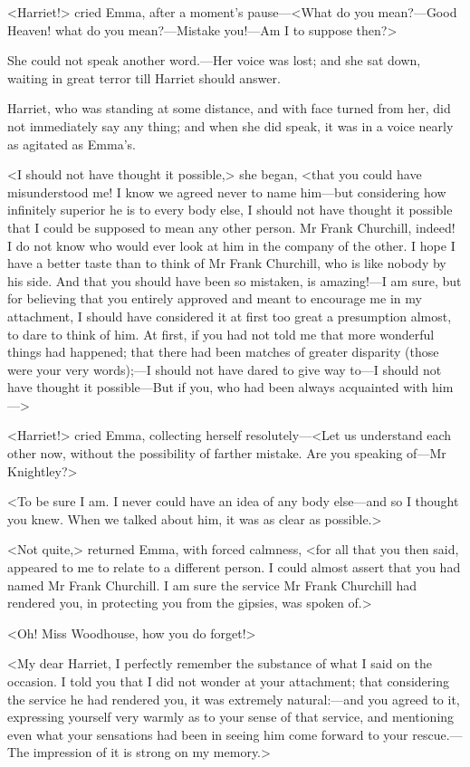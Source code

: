 <Harriet!> cried Emma, after a moment's pause—<What do you mean?—Good Heaven! what do you mean?—Mistake you!—Am I to suppose then?\longdash>

She could not speak another word.—Her voice was lost; and she sat down, waiting in great terror till Harriet should answer.

Harriet, who was standing at some distance, and with face turned from her, did not immediately say any thing; and when she did speak, it was in a voice nearly as agitated as Emma's.

<I should not have thought it possible,> she began, <that you could have misunderstood me! I know we agreed never to name him—but considering how infinitely superior he is to every body else, I should not have thought it possible that I could be supposed to mean any other person. Mr Frank Churchill, indeed! I do not know who would ever look at him in the company of the other. I hope I have a better taste than to think of Mr Frank Churchill, who is like nobody by his side. And that you should have been so mistaken, is amazing!—I am sure, but for believing that you entirely approved and meant to encourage me in my attachment, I should have considered it at first too great a presumption almost, to dare to think of him. At first, if you had not told me that more wonderful things had happened; that there had been matches of greater disparity (those were your very words);—I should not have dared to give way to—I should not have thought it possible—But if you, who had been always acquainted with him—>

<Harriet!> cried Emma, collecting herself resolutely—<Let us understand each other now, without the possibility of farther mistake. Are you speaking of—Mr Knightley?>

<To be sure I am. I never could have an idea of any body else—and so I thought you knew. When we talked about him, it was as clear as possible.>

<Not quite,> returned Emma, with forced calmness, <for all that you then said, appeared to me to relate to a different person. I could almost assert that you had named Mr Frank Churchill. I am sure the service Mr Frank Churchill had rendered you, in protecting you from the gipsies, was spoken of.>

<Oh! Miss Woodhouse, how you do forget!>

<My dear Harriet, I perfectly remember the substance of what I said on the occasion. I told you that I did not wonder at your attachment; that considering the service he had rendered you, it was extremely natural:—and you agreed to it, expressing yourself very warmly as to your sense of that service, and mentioning even what your sensations had been in seeing him come forward to your rescue.—The impression of it is strong on my memory.>

